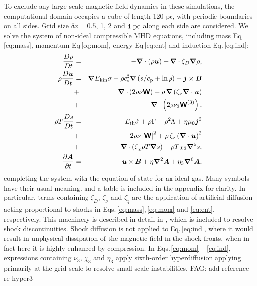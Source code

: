 \documentclass[preprint2]{aastex63}
\newcommand\ESK{E_{\rm kin}}
\newcommand\EST{E_{\rm th}}
\newcommand{\vect}[1]{{{\mbox{\boldmath $#1$}}}}%
\newcommand{\mathbfss}[1]{\textbf{\textsf{#1}}}
\newcommand\pc{~ {\rm pc}}
\newcommand{\fag}[1]{\textcolor{midgreen}{FAG: #1}}
\begin{document}
To exclude any large scale magnetic field dynamics in these simulations, the
computational domain occupies a cube of length 120 pc, with periodic boundaries
on all sides.
Grid size $\delta x=0.5$, 1, 2 and $4\pc$  along each side are considered.
We solve the system of non-ideal compressible MHD equations, including 
mass Eq\,\eqref{eq:mass}, momentum Eq\,\eqref{eq:mom}, energy Eq\,\eqref{eq:ent} and
induction Eq.\,\eqref{eq:ind}:
  \begin{eqnarray}
  \label{eq:mass}
    \frac{D\rho}{Dt} &=& 
    -\vect\nabla \cdot (\rho \vect{u})
    +\vect\nabla \cdot\zeta_D\vect\nabla\rho,\\
  \label{eq:mom}
    \rho\frac{D\vect{u}}{Dt} &=& 
    \vect\nabla{\ESK\sigma}
    -\rho c_{\rm s}^2\vect\nabla\left({s}/{c_{\rm p}}+\ln\rho\right)
    +\vect{j}\times\vect{B}
    \nonumber\\
    &+&\vect\nabla\cdot \left(2\rho\nu{\mathbfss W}\right)
    +\rho\,\vect\nabla\left(\zeta_{\nu}\vect\nabla \cdot \vect{u} \right)
    \nonumber\\
    &+&\vect\nabla\cdot \left(2\rho\nu_3{\mathbfss W}^{(3)}\right),\\
  \label{eq:ent}
    \rho T\frac{D s}{Dt} &=&
     \EST\dot\sigma +\rho\Gamma
    -\rho^2\Lambda +\eta\mu_0\vect{j}^2 
    \nonumber\\
    &+&2 \rho \nu\left|{\mathbfss W}\right|^{2}
    +\rho\,\zeta_{\nu}\left(\vect\nabla \cdot \vect{u} \right)^2
    \nonumber\\
    &+&\vect\nabla\cdot\left(\zeta_\chi\rho T\vect\nabla s\right)
    +\rho T\chi_3\vect\nabla^6 s,\\
  \label{eq:ind}
    \frac{\partial \vect{A}}{\partial t} &=&
    \vect{u}\times\vect{B}
    +\eta\vect\nabla^2\vect{A}
    +\eta_3\vect\nabla^6\vect{A},
  \end{eqnarray}
completing the system with the equation of state for an ideal gas.
Many symbols have their usual meaning, and a table is included in the appendix
for clarity.
In particular, terms containing $\zeta_D,\,\zeta_\nu$ and $\zeta_\eta$ are the
application of artificial diffusion acting proportional to shocks in 
Eqs.\,\eqref{eq:mass},\,\eqref{eq:mom} and \eqref{eq:ent}, respectively.
This machinery is described in detail in \citet{GMKSH20}, which is included to
resolve shock discontinuities.
Shock diffusion is not applied to Eq.\,\eqref{eq:ind}, where it would result in 
unphysical dissipation of the magnetic field in the shock fronts, when in fact 
here it is highly enhanced by compression.
In Eqs.\,\eqref{eq:mom} -- \eqref{eq:ind}, expressions containing 
$\nu_3,\,\chi_3$ and $\eta_3$ apply sixth-order hyperdiffusion applying primarily
at the grid scale to resolve small-scale instabilities.
\fag{add reference re hyper3}
\end{document}
